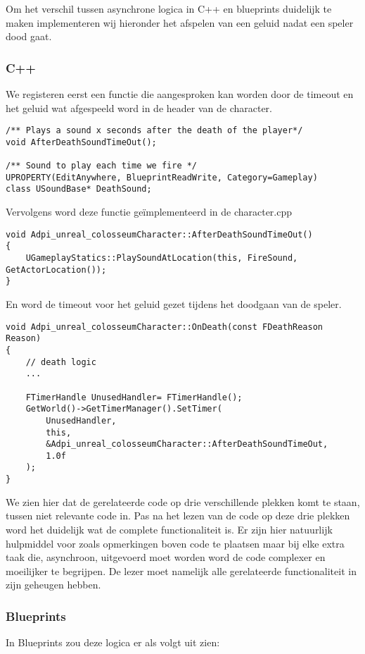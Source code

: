 Om het verschil tussen asynchrone logica in C++ en blueprints duidelijk te maken implementeren wij hieronder het afspelen van een geluid nadat een speler dood gaat.

\subsubsection{C++}
We registeren eerst een functie die aangesproken kan worden door de timeout en het geluid wat afgespeeld word in de header van de character.

\begin{lstlisting}	
/** Plays a sound x seconds after the death of the player*/
void AfterDeathSoundTimeOut();

/** Sound to play each time we fire */
UPROPERTY(EditAnywhere, BlueprintReadWrite, Category=Gameplay)
class USoundBase* DeathSound;
\end{lstlisting}

Vervolgens word deze functie geïmplementeerd in de character.cpp

\begin{lstlisting}
void Adpi_unreal_colosseumCharacter::AfterDeathSoundTimeOut() 
{
	UGameplayStatics::PlaySoundAtLocation(this, FireSound, GetActorLocation());
}
\end{lstlisting}

En word de timeout voor het geluid gezet tijdens het doodgaan van de speler.

\begin{lstlisting}
void Adpi_unreal_colosseumCharacter::OnDeath(const FDeathReason Reason)
{
	// death logic
	...

	FTimerHandle UnusedHandler= FTimerHandle();
	GetWorld()->GetTimerManager().SetTimer(
		UnusedHandler, 
		this, 
		&Adpi_unreal_colosseumCharacter::AfterDeathSoundTimeOut, 
		1.0f
	);
}
\end{lstlisting}

We zien hier dat de gerelateerde code op drie verschillende plekken komt te staan, tussen niet relevante code in. Pas na het lezen van de code op deze drie plekken word het duidelijk wat de complete functionaliteit is. Er zijn hier natuurlijk hulpmiddel voor zoals opmerkingen boven code te plaatsen maar bij elke extra taak die, asynchroon, uitgevoerd moet worden word de code complexer en moeilijker te begrijpen. De lezer moet namelijk alle gerelateerde functionaliteit in zijn geheugen hebben.

\subsubsection{Blueprints}
In Blueprints zou deze logica er als volgt uit zien:


